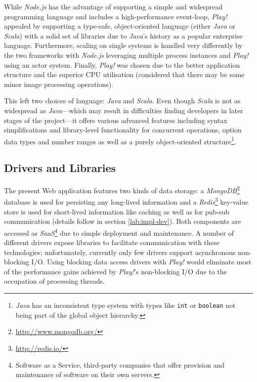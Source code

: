 While \textit{Node.js} has the advantage of supporting a simple and widespread programming language and includes a high-performance event-loop, \textit{Play!} appealed by supporting a type-safe, object-oriented language (either \textit{Java} or \textit{Scala}) with a solid set of libraries due to \textit{Java}'s history as a popular enterprise language. Furthermore, scaling on single systems is handled very differently by the two frameworks with \textit{Node.js} leveraging multiple process instances and \textit{Play!} using an actor system. Finally, \textit{Play!} was chosen due to the better application structure and the superior CPU utilisation (considered that there may be some minor image processing operations).

This left two choices of language: \textit{Java} and \textit{Scala}. Even though \textit{Scala} is not as widespread as \textit{Java}---which may result in difficulties finding developers in later stages of the project---it offers various advanced features including syntax simplifications and library-level functionality for concurrent operations, option data types and number ranges as well as a purely object-oriented structure\footnote{\textit{Java} has an inconsistent type system with types like \texttt{int} or \texttt{boolean} not being part of the global object hierarchy.}.

\subsection{Drivers and Libraries}
The present Web application features two kinds of data storage: a \textit{MongoDB}\footnote{\url{http://www.mongodb.org/}} database is used for persisting any long-lived information and a \textit{Redis}\footnote{\url{http://redis.io/}} key-value store is used for short-lived information like caching as well as for pub-sub communication (details follow in section \ref{lab:impl-dev}). Both components are accessed as \textit{SaaS}\footnote{Software as a Service, third-party companies that offer provision and maintenance of software on their own servers.} due to simple deployment and maintenance. A number of different drivers expose libraries to facilitate communication with these technologies; unfortunately, currently only few drivers support asynchronous non-blocking I/O. Using blocking data access drivers with \textit{Play!} would eliminate most of the performance gains achieved by \textit{Play!}'s non-blocking I/O due to the occupation of processing threads.

